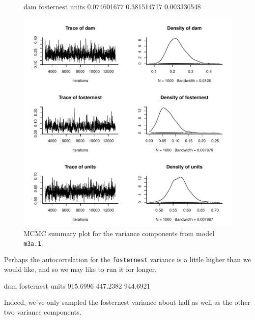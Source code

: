 \documentclass{article}
\begin{document}
\begin{figure}[!h]
\begin{center}
\begin{Schunk}
\begin{Soutput}
        dam  fosternest       units 
0.074601677 0.381514717 0.003330548 
\end{Soutput}
\end{Schunk}
\includegraphics{Lecture3-005}
\end{center}
\caption{MCMC summary plot for the variance components from model \texttt{m3a.1}.}
\label{mBTVCV-fig}
\end{figure}

Perhaps the autocorrelation for the \texttt{fosternest} variance is a little higher than we would like, and so we may like to run it for longer.

\begin{Schunk}
\begin{Soutput}
       dam fosternest      units 
  915.6996   447.2382   944.6921 
\end{Soutput}
\end{Schunk}

Indeed, we've only sampled the fosternest variance about half as well as the other two variance components.\\
\end{document}
